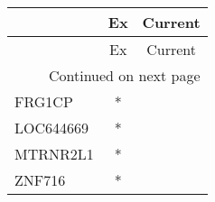 \begin{longtable}{lcc}
\toprule
{} & Ex & Current \\
\midrule
\endfirsthead

\toprule
{} & Ex & Current \\
\midrule
\endhead
\midrule
\multicolumn{3}{r}{{Continued on next page}} \\
\midrule
\endfoot

\bottomrule
\endlastfoot
FRG1CP    &  * &         \\
LOC644669 &  * &         \\
MTRNR2L1  &  * &         \\
ZNF716    &  * &         \\
\end{longtable}

